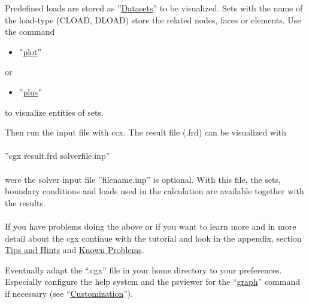 \documentclass{article}
\providecommand{\htmlref}[2]{\hyperref[#2]{#1}}
\begin{document}
Predefined loads are stored as ''\htmlref{Datasets}{Datasets}'' to be visualized. Sets with the name of the load-type (CLOAD, DLOAD) store the related nodes, faces or elements. Use the command
\begin{itemize}
\item ''\htmlref{plot}{plot}''
\end{itemize}
or
\begin{itemize}
\item ''\htmlref{plus}{plus}''
\end{itemize}
to visualize entities of sets.

Then run the input file with ccx. The result file (.frd) can be visualized with\\\\  ''cgx result.frd solverfile.inp''\\\\were the solver input file ''filename.inp'' is optional. With this file, the sets, boundary conditions and loads used in the calculation are available together with the results.\\\\If you have problems doing the above or if you want to learn more and in more detail about the cgx continue with the tutorial \cite{tutorial} and look in the appendix, section \htmlref{Tips and Hints}{Tips and Hints} and \htmlref{Known Problems}{Known Problems}.    

Eventually adapt the ``.cgx'' file in your home directory to your preferences. Especially configure the help system and the psviewer for the ``\htmlref{graph}{graph}'' command if necessary (see ``\htmlref{Customization}{Customization}'').
\end{document}
